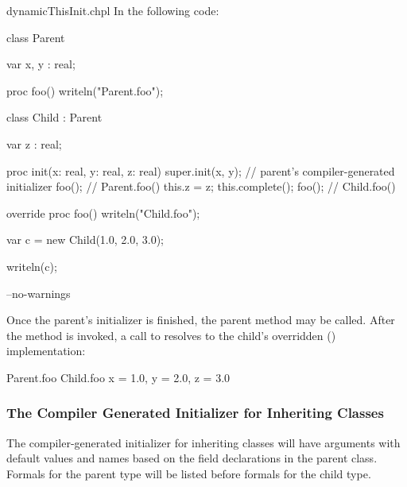 \begin{chapelexample}{dynamicThisInit.chpl}
In the following code:
\begin{chapel}
class Parent {
  var x, y : real;

  proc foo() {
    writeln("Parent.foo");
  }
}

class Child : Parent {
  var z : real;

  proc init(x: real, y: real, z: real) {
    super.init(x, y); // parent's compiler-generated initializer
    foo(); // Parent.foo()
    this.z = z;
    this.complete();
    foo(); // Child.foo()
  }

  override proc foo() {
    writeln("Child.foo");
  }
}

var c = new Child(1.0, 2.0, 3.0);
\end{chapel}
\begin{chapelpost}
writeln(c);
\end{chapelpost}
\begin{chapelcompopts}
--no-warnings
\end{chapelcompopts}
Once the parent's initializer is finished, the parent method  may be
called. After the  method is invoked, a call to 
resolves to the child's overridden ()
implementation:
\begin{chapelprintoutput}{}
Parent.foo
Child.foo
{x = 1.0, y = 2.0, z = 3.0}
\end{chapelprintoutput}
\end{chapelexample}

\subsubsection{The Compiler Generated Initializer for Inheriting Classes}
\label{The_Compiler_Generated_Initializer_for_Inheriting_Classes}

The compiler-generated initializer for inheriting classes will have arguments
with default values and names based on the field declarations in the parent
class. Formals for the parent type will be listed before formals for the
child type.

